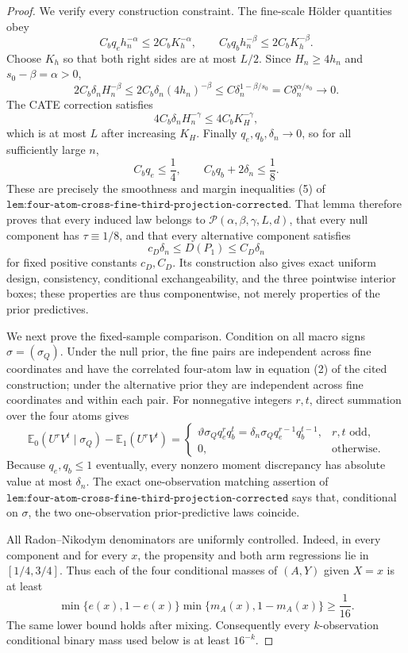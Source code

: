 \documentclass{article}
\begin{document}
\begin{proof}
We verify every construction constraint.  The fine-scale Hölder quantities obey
\[
 C_bq_eh_n^{-\alpha}\leq2C_bK_h^{-\alpha},
 \qquad
 C_bq_bh_n^{-\beta}\leq2C_bK_h^{-\beta}.
\]
Choose \(K_h\) so that both right sides are at most \(L/2\).  Since \(H_n\geq4h_n\) and \(s_0-\beta=\alpha>0\),
\[
 2C_b\delta_nH_n^{-\beta}
 \leq 2C_b\delta_n(4h_n)^{-\beta}
 \leq C\delta_n^{1-\beta/s_0}
 =C\delta_n^{\alpha/s_0}\longrightarrow0.
\]
The CATE correction satisfies
\[
 4C_b\delta_nH_n^{-\gamma}\leq4C_bK_H^{-\gamma},
\]
which is at most \(L\) after increasing \(K_H\).  Finally \(q_e,q_b,\delta_n\to0\), so for all sufficiently large \(n\),
\[
 C_bq_e\leq\frac14,
 \qquad
 C_bq_b+2\delta_n\leq\frac18.
\]
These are precisely the smoothness and margin inequalities (5) of \(\texttt{lem:four-atom-cross-fine-third-projection-corrected}\).  That lemma therefore proves that every induced law belongs to \(\mathcal P(\alpha,\beta,\gamma,L,d)\), that every null component has \(\tau\equiv1/8\), and that every alternative component satisfies
\[
 c_D\delta_n\leq D(P_1)\leq C_D\delta_n
\]
for fixed positive constants \(c_D,C_D\).  Its construction also gives exact uniform design, consistency, conditional exchangeability, and the three pointwise interior boxes; these properties are thus componentwise, not merely properties of the prior predictives.

We next prove the fixed-sample comparison.  Condition on all macro signs \(\sigma=(\sigma_Q)\).  Under the null prior, the fine pairs are independent across fine coordinates and have the correlated four-atom law in equation (2) of the cited construction; under the alternative prior they are independent across fine coordinates and within each pair.  For nonnegative integers \(r,t\), direct summation over the four atoms gives
\[
 \mathbb E_0(U^rV^t\mid\sigma_Q)-\mathbb E_1(U^rV^t)
 =
 \begin{cases}
 \vartheta\sigma_Qq_e^rq_b^t
 =\delta_n\sigma_Qq_e^{r-1}q_b^{t-1},&r,t\text{ odd},\\
 0,&\text{otherwise}.
 \end{cases}
\]
Because \(q_e,q_b\leq1\) eventually, every nonzero moment discrepancy has absolute value at most \(\delta_n\).  The exact one-observation matching assertion of \(\texttt{lem:four-atom-cross-fine-third-projection-corrected}\) says that, conditional on \(\sigma\), the two one-observation prior-predictive laws coincide.

All Radon--Nikodym denominators are uniformly controlled.  Indeed, in every component and for every \(x\), the propensity and both arm regressions lie in \([1/4,3/4]\).  Thus each of the four conditional masses of \((A,Y)\) given \(X=x\) is at least
\[
 \min\{e(x),1-e(x)\}\min\{m_A(x),1-m_A(x)\}\geq\frac1{16}.
\]
The same lower bound holds after mixing.  Consequently every \(k\)-observation conditional binary mass used below is at least \(16^{-k}\).


\end{proof}
\end{document}
